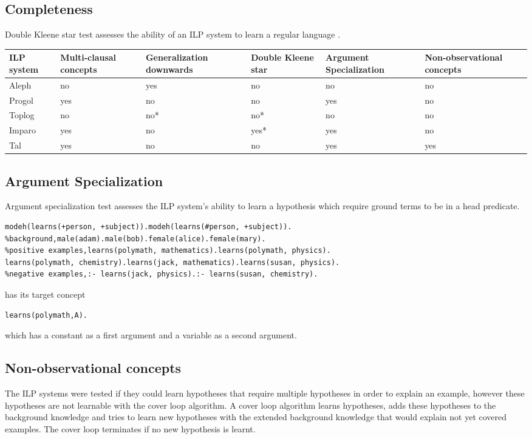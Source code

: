 \subsection{Completeness}
Double Kleene star test assesses the ability of an ILP system to learn a regular language .
\begin{center}
    \begin{tabular}{ | p{2cm} | p{2cm} | p{2cm} | p{2cm} | p{2cm} | p{2cm} |}
    \hline
    ILP system & Multi-clausal concepts & Generalization downwards &
    Double Kleene star & Argument Specialization &
    Non-observational concepts\\ \hline
    Aleph & no & yes & no & no & no\\ \hline
    Progol & yes & no & no & yes & no\\ \hline
    Toplog & no & no* & no* & no & no\\ \hline
    Imparo & yes & no & yes* & yes & no\\ \hline
    Tal & yes & no & no & yes & yes\\ \hline
    \hline
    \end{tabular}
\end{center}

\subsection{Argument Specialization}
Argument specialization test assesses the ILP system's ability to learn a hypothesis which require ground terms to be in a head predicate.
\begin{lstlisting}
modeh(learns(+person, +subject)).modeh(learns(#person, +subject)).
%background,male(adam).male(bob).female(alice).female(mary).
%positive examples,learns(polymath, mathematics).learns(polymath, physics).
learns(polymath, chemistry).learns(jack, mathematics).learns(susan, physics).
%negative examples,:- learns(jack, physics).:- learns(susan, chemistry).
\end{lstlisting}
has its target concept
\begin{lstlisting}
learns(polymath,A).
\end{lstlisting}
which has a constant  as a first argument and a variable as a second argument.

\subsection{Non-observational concepts}
The ILP systems were tested if they could learn hypotheses that require multiple hypotheses in order to explain an example, however these hypotheses are not learnable with the cover loop algorithm. A cover loop algorithm learns hypotheses, adds these hypotheses to the background knowledge and tries to learn new hypotheses with the extended background knowledge that would explain not yet covered examples. The cover loop terminates if no new hypothesis is learnt.

